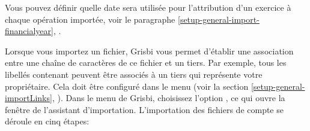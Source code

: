 Vous pouvez définir quelle date sera utilisée pour l'attribution d'un exercice à 
chaque opération importée, voir le paragraphe \vref{setup-general-import-financialyear}, .

Lorsque vous importez un fichier, Grisbi vous permet d'établir une association entre une chaîne de caractères de ce fichier et un tiers. Par exemple, tous les libellés contenant  peuvent être associés à un tiers qui représente votre propriétaire. Cela doit être configuré dans le menu  (voir la section \vref{setup-general-importLinks}, ).
Dans le menu  de Grisbi, choisissez l'option , ce qui ouvre la fenêtre de l'assistant d'importation. L'importation des fichiers de compte se déroule en cinq étapes:


